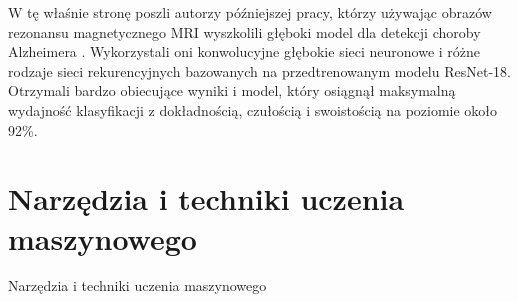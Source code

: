 W tę właśnie stronę poszli autorzy późniejszej pracy, którzy używając obrazów rezonansu magnetycznego MRI wyszkolili głęboki model dla detekcji choroby Alzheimera \cite{ebrahimi2021deep}.
Wykorzystali oni konwolucyjne głębokie sieci neuronowe i różne rodzaje sieci rekurencyjnych bazowanych na przedtrenowanym modelu ResNet-18.
Otrzymali bardzo obiecujące wyniki i model, który osiągnął maksymalną wydajność klasyfikacji z dokładnością, czułością i swoistością na poziomie około 92\%.

\section{Narzędzia i techniki uczenia maszynowego}

Narzędzia i techniki uczenia maszynowego
